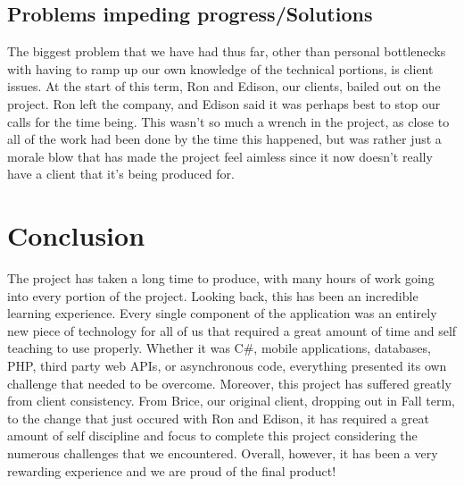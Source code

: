 \documentclass[letterpaper,10pt,titlepage,journal,compsoc,draftclsnofoot,onecolumn]{IEEEtran}
\begin{document}
\subsection{Problems impeding progress/Solutions}

The biggest problem that we have had thus far, other than personal bottlenecks with having to ramp up our own knowledge of the technical portions, is client issues. At the start of this term, Ron and Edison, our clients, bailed out on the project. Ron left the company, and Edison said it was perhaps best to stop our calls for the time being. This wasn't so much a wrench in the project, as close to all of the work had been done by the time this happened, but was rather just a morale blow that has made the project feel aimless since it now doesn't really have a client that it's being produced for.

\section{Conclusion}
The project has taken a long time to produce, with many hours of work going into every portion of the project. Looking back, this has been an incredible learning experience. Every single component of the application was an entirely new piece of technology for all of us that required a great amount of time and self teaching to use properly. Whether it was C#, mobile applications, databases, PHP, third party web APIs, or asynchronous code, everything presented its own challenge that needed to be overcome. Moreover, this project has suffered greatly from client consistency. From Brice, our original client, dropping out in Fall term, to the change that just occured with Ron and Edison, it has required a great amount of self discipline and focus to complete this project considering the numerous challenges that we encountered. Overall, however, it has been a very rewarding experience and we are proud of the final product!
\end{document}
